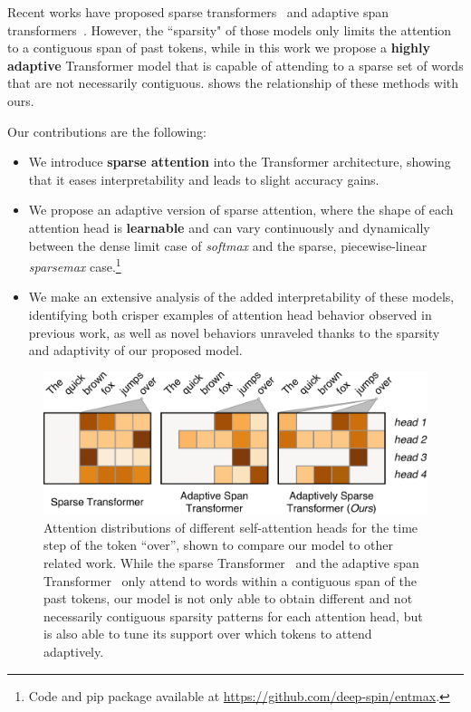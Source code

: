 \begin{sloppypar}
    Recent works have proposed sparse
    transformers~\citep{openai_sparse_transf} and adaptive span
    transformers~\citep{Sukhbaatar2019}. However, the ``sparsity" of those
    models only limits the attention to a contiguous span of past tokens,
    while in this work we propose a \textbf{highly adaptive} Transformer
    model that is capable of attending to a sparse set of words that are
    not necessarily contiguous.  shows the
    relationship of these methods with ours.
\end{sloppypar}

Our contributions are the following:

\begin{itemize}
    \item We introduce \textbf{sparse attention} into the
          Transformer architecture, showing that it eases
          interpretability and leads to slight accuracy gains.
    \item We propose an adaptive version of sparse attention,
          where the shape of each attention head is {\bf learnable} and can vary continuously and
          dynamically between the dense limit case of \emph{softmax} and the sparse,
          piecewise-linear \emph{sparsemax} case.\footnote{
              Code and pip package available at \url{https://github.com/deep-spin/entmax}.}
    \item We make an extensive analysis of the added interpretability of these
          models, identifying both crisper examples of attention head behavior observed in
          previous work, as well as novel behaviors unraveled thanks to the sparsity
          and adaptivity of our proposed model.
\end{itemize}

\begin{figure}[htbp]
    \centering
    \includegraphics[width=0.95\columnwidth]{Figures/comparison.pdf}
    \caption{Attention distributions of different self-attention heads for the
        time step of the token ``over'', shown to compare our model to other
        related work. While the sparse
        Transformer~\citep{openai_sparse_transf} and the adaptive span
        Transformer~\citep{Sukhbaatar2019} only attend to words within a
        contiguous span of the past tokens, our model is not only able to
        obtain different and not necessarily contiguous sparsity patterns for
        each attention head, but is also able to tune its support over which
        tokens to attend adaptively.}
    \label{fig:comparison}
\end{figure}

